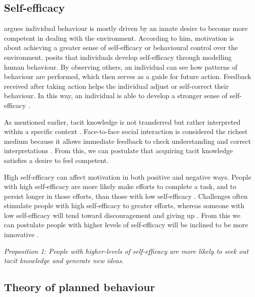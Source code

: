\subsection{Self-efficacy}

\citet{white1959motivation} argues individual behaviour is mostly driven by an innate desire to become more competent in dealing with the environment. According to him, motivation is about achieving a greater sense of self-efficacy or behavioural control over the environment. \citet{bandura1977self} posits that individuals develop self-efficacy through modelling human behaviour. By observing others, an individual can see how patterns of behaviour are performed, which then serves as a guide for future action. Feedback received after taking action helps the individual adjust or self-correct their behaviour. In this way, an individual is able to develop a stronger sense of self-efficacy \citep{bandura1977self}. \medskip

As mentioned earlier, tacit knowledge is not transferred but rather interpreted within a specific context \citep{nonaka1995knowledge,duguid2005art,marabelli2014knowing}. Face-to-face social interaction is considered the richest medium because it allows immediate feedback to check understanding and correct interpretations \citep{koskinen2003tacit}. From this, we can postulate that acquiring tacit knowledge satisfies a desire to feel competent. \medskip

High self-efficacy can affect motivation in both positive and negative ways. People with high self-efficacy are more likely make efforts to complete a task, and to persist longer in those efforts, than those with low self-efficacy \citep{schunk1990goal}. Challenges often stimulate people with high self-efficacy to greater efforts, whereas someone with low self-efficacy will tend toward discouragement and giving up \citep{zimmerman1992self}. From this we can postulate people with higher levels of self-efficacy will be inclined to be more innovative \citep{gist1989influence}. \medskip 

\emph{Proposition 1: People with higher-levels of self-efficacy are more likely to seek out tacit knowledge and generate new ideas.}

\subsection{Theory of planned behaviour}

